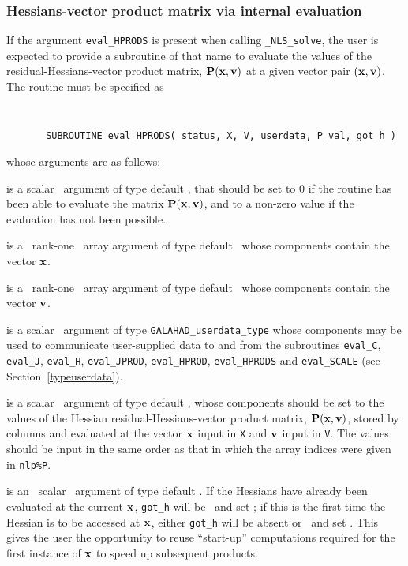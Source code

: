 \documentclass{galahad}
\newcommand{\packagename}{NLS}
\newcommand{\fullpackagename}{\libraryname\_\packagename}
\newcommand{\solver}{{\tt \fullpackagename\_solve}}
\begin{document}

\subsubsection{Hessians-vector product matrix via internal evaluation\label{hpfv}}

If the argument {\tt eval\_HPRODS} is present when calling \solver, the
user is expected to provide a subroutine of that name to evaluate the
values of the residual-Hessians-vector product matrix, ${\mathbf{P}}({\mathbf{x}},{\mathbf{v}})$
at a given vector pair $({\mathbf{x}},{\mathbf{v}})$.
The routine must be specified as
\def\baselinestretch{0.8}
{\tt
\begin{verbatim}
       SUBROUTINE eval_HPRODS( status, X, V, userdata, P_val, got_h )
\end{verbatim} }
\def\baselinestretch{1.0}
\noindent whose arguments are as follows:

\begin{description}
 is a scalar \intentout\ argument of type default \integer,
that should be set to 0 if the routine has been able to evaluate the
matrix ${\mathbf{P}}({\mathbf{x}},{\mathbf{v}})$,
and to a non-zero value if the evaluation has not been possible.

 is a \ rank-one \intentin\ array argument of type
default \realdp\ whose components contain the vector ${\mathbf{x}}$.

 is a \ rank-one \intentin\ array argument of type
default \realdp\ whose components contain the vector ${\mathbf{v}}$.

 is a scalar \intentinout\ argument of type
{\tt GALAHAD\_userdata\_type} whose components may be used
to communicate user-supplied data to and from the subroutines
{\tt eval\_C}, {\tt eval\_J}, {\tt eval\_H}, {\tt eval\_JPROD},
{\tt eval\_HPROD}, {\tt eval\_HPRODS} and {\tt eval\_SCALE}
(see Section~\ref{typeuserdata}).

 is a scalar \intentout\ argument of type default \realdp,
whose components should be set to the values of the Hessian
residual-Hessians-vector product matrix, ${\mathbf{P}}({\mathbf{x}},{\mathbf{v}})$,
stored by columns and evaluated at the vector ${\mathbf{x}}$ input in {\tt X}
and ${\mathbf{v}}$ input in {\tt V}.
The values should be input in the same order as that in which the array
indices were given in {\tt nlp\%P}.

 is an \optional\ scalar \intentin\ argument of type default
\logical. If the Hessians have already been evaluated at the current
${\mathbf{x}}$, {\tt got\_h} will be \present\ and set \true; if this is the first time
the Hessian is to be accessed at ${\mathbf{x}}$, either {\tt got\_h} will
be absent or \present\ and set \false. This gives the user the opportunity
to reuse ``start-up'' computations required for the first instance of
${\mathbf{x}}$ to speed up subsequent products.

\end{description}
\end{document}
